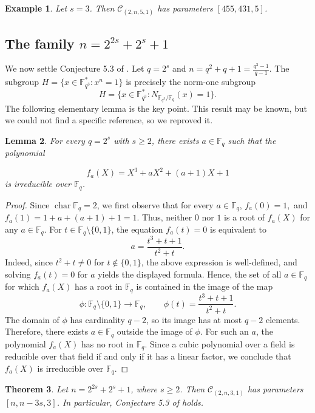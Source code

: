 \documentclass[12pt,draftcls,journal,onecolumn]{IEEEtran}
\newtheorem{theorem}{Theorem}
\newtheorem{lemma}[theorem]{Lemma}
\newtheorem{example}[theorem]{Example}
\newcommand{\F}{{\mathbb{F}}}
\newcommand{\C}{{\mathcal{C}}}
\begin{document}
\begin{example}
Let \( s = 3 \). Then \( \mathcal{C}_{(2,n,5,1)} \) has parameters \([455,431,5]\).
\end{example}

\subsection{The family $n=2^{2s}+2^s+1$}

We now settle Conjecture 5.3 of \cite{Chen59}.
Let
$q=2^s$ and
$n=q^2+q+1=\frac{q^3-1}{q-1}.$
The subgroup
$
H=\{x\in\F_{q^3}^*:x^n=1\}
$
is precisely the norm-one subgroup
\[
H=\{x\in\F_{q^3}^*:N_{\F_{q^3}/\F_q}(x)=1\}.
\]
The following elementary lemma is the key point. This result may be known, but we could not find a specific reference, so we reproved it.

\begin{lemma}\label{lem:irreduciblecubic}
For every $q=2^s$ with $s\ge2$, there exists $a\in\F_q$ such that the polynomial

\[
f_a(X)=X^3+aX^2+(a+1)X+1
\]
is irreducible over $\F_q$.
\end{lemma}

\begin{proof}  Since \(\operatorname{char}\mathbb F_q=2\), we first observe that for every \(a\in\mathbb F_q\),
$
f_a(0)=1,
$
and
$
f_a(1)=1+a+(a+1)+1=1.
$
Thus, neither \(0\) nor \(1\) is a root of \(f_a(X)\) for any \(a\in\mathbb F_q\).
For $t\in\mathbb F_q\setminus\{0,1\}$, the equation $f_a(t)=0$ is equivalent to
\[
a=\frac{t^3+t+1}{t^2+t}.
\]
Indeed, since $t^2+t\neq0$ for $t\notin\{0,1\}$, the above expression is well-defined, and solving $f_a(t)=0$ for $a$ yields the displayed formula. Hence, the set of all $a\in\mathbb F_q$ for which $f_a(X)$ has a root in $\mathbb F_q$ is contained in the image of the map
\[
\phi:\mathbb F_q\setminus\{0,1\}\to\mathbb F_q,\qquad
\phi(t)=\frac{t^3+t+1}{t^2+t}.
\]
The domain of $\phi$ has cardinality $q-2$, so its image has at most $q-2$ elements. Therefore, there exists $a\in\mathbb F_q$ outside the image of $\phi$. For such an $a$, the polynomial $f_a(X)$ has no root in $\mathbb F_q$. Since a cubic polynomial over a field is reducible over that field if and only if it has a linear factor, we conclude that $f_a(X)$ is irreducible over $\mathbb F_q$.
\end{proof}

\begin{theorem}\label{thm:conj59}
Let $n=2^{2s}+2^s+1$, where $s\ge2$.
Then $\C_{(2,n,3,1)}$ has parameters $[n,n-3s,3]$.
In particular, Conjecture 5.3 of \cite{Chen59} holds.
\end{theorem}
\end{document}
